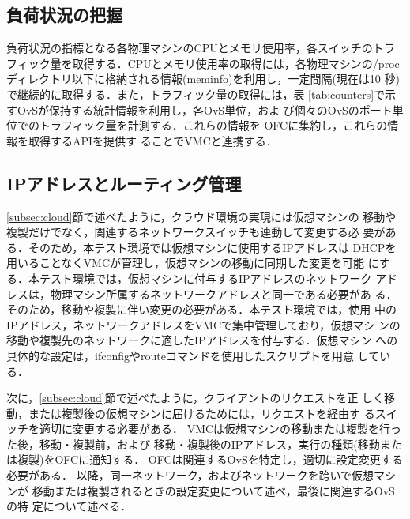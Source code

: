 \documentclass[submit,techrep]{ipsj}
\begin{document}
\subsection{負荷状況の把握}
負荷状況の指標となる各物理マシンのCPUとメモリ使用率，各スイッチのトラ
フィック量を取得する．CPUとメモリ使用率の取得には，各物理マシンの/proc
ディレクトリ以下に格納される情報(meminfo)を利用し，一定間隔(現在は10
秒)で継続的に取得する．また，トラフィック量の取得には，表
\ref{tab:counters}で示すOvSが保持する統計情報を利用し，各OvS単位，およ
び個々のOvSのポート単位でのトラフィック量を計測する．これらの情報を
OFCに集約し，これらの情報を取得するAPIを提供す
ることでVMCと連携する．

\subsection{IPアドレスとルーティング管理}
\label{subsec:ip_routing}
\ref{subsec:cloud}節で述べたように，クラウド環境の実現には仮想マシンの
移動や複製だけでなく，関連するネットワークスイッチも連動して変更する必
要がある．そのため，本テスト環境では仮想マシンに使用するIPアドレスは
DHCPを用いることなくVMCが管理し，仮想マシンの移動に同期した変更を可能
にする．本テスト環境では，仮想マシンに付与するIPアドレスのネットワーク
アドレスは，物理マシン所属するネットワークアドレスと同一である必要があ
る．そのため，移動や複製に伴い変更の必要がある．本テスト環境では，使用
中のIPアドレス，ネットワークアドレスをVMCで集中管理しており，仮想マシ
ンの移動や複製先のネットワークに適したIPアドレスを付与する．仮想マシン
への具体的な設定は，ifconfigやrouteコマンドを使用したスクリプトを用意
している．

次に，\ref{subsec:cloud}節で述べたように，クライアントのリクエストを正
しく移動，または複製後の仮想マシンに届けるためには，リクエストを経由す
るスイッチを適切に変更する必要がある．
VMCは仮想マシンの移動または複製を行った後，移動・複製前，および
移動・複製後のIPアドレス，実行の種類(移動または複製)をOFCに通知する．
OFCは関連するOvSを特定し，適切に設定変更する必要がある．
以降，同一ネットワーク，およびネットワークを跨いで仮想マシンが
移動または複製されるときの設定変更について述べ，最後に関連するOvSの特
定について述べる．


\end{document}

